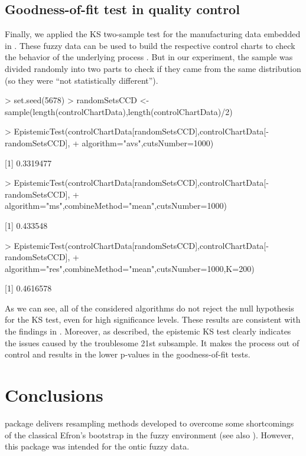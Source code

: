 

\subsection{Goodness-of-fit test in quality control}


Finally, we applied the KS two-sample test for the manufacturing data embedded in .
These fuzzy data can be used to build the respective control charts to check the behavior of the underlying process \citep{FARAZ20102684}.
But in our experiment, the sample was divided randomly into two parts to check if they came from the same distribution (so they were ``not statistically different'').

\begin{example}
> set.seed(5678)
> randomSetsCCD <- sample(length(controlChartData),length(controlChartData)/2)

> EpistemicTest(controlChartData[randomSetsCCD],controlChartData[-randomSetsCCD],
+  algorithm="avs",cutsNumber=1000)

[1] 0.3319477

> EpistemicTest(controlChartData[randomSetsCCD],controlChartData[-randomSetsCCD],
+  algorithm="ms",combineMethod="mean",cutsNumber=1000)

[1] 0.433548

> EpistemicTest(controlChartData[randomSetsCCD],controlChartData[-randomSetsCCD],
+  algorithm="res",combineMethod="mean",cutsNumber=1000,K=200)

[1] 0.4616578
\end{example}

As we can see, all of the considered algorithms do not reject the null hypothesis for the KS test, even for high significance levels.
These results are consistent with the findings in \cite{FARAZ20102684}.
Moreover, as \cite{PGMR2024AMS} described, the epistemic KS test clearly indicates the issues caused by the troublesome 21st subsample.
It makes the process out of control and results in the lower p-values in the goodness-of-fit tests.




\section{Conclusions}


 package delivers resampling methods developed to overcome some shortcomings of the classical Efron's bootstrap in the fuzzy environment (see also \cite{fuzzyResamplingArt}).
However, this package was intended for the ontic fuzzy data.

